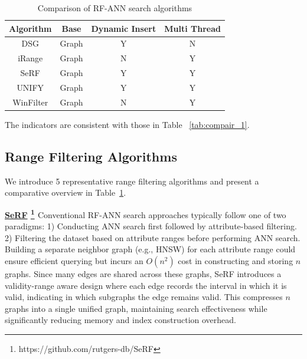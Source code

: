 \documentclass[sigconf, nonacm]{acmart}
\begin{document}
	
	
	\renewcommand{\arraystretch}{0.9}
	\begin{table}[t]
		\centering
		
		\setlength{\textfloatsep}{0.1cm}
		\caption{Comparison of RF-ANN search algorithms}
		\small	%
		\label{tab:range_algo}
		\begin{tabular}{|c|c|c|c|}
			\hline
			\textbf{Algorithm} & \textbf{Base} & \textbf{Dynamic Insert} & \textbf{Multi Thread} \\
			\hline
			DSG & Graph & Y & N \\
			iRange & Graph & N & Y \\
			SeRF & Graph & Y & Y \\
			UNIFY & Graph & Y & Y \\
			WinFilter & Graph & N & Y  \\
			\hline
		\end{tabular}
		
		
		\footnotesize{
			\begin{minipage}{\linewidth}
				\centering
				The indicators are consistent with those in Table ~\ref{tab:compair_1}.
			\end{minipage} 
			
		}
		
	\end{table}
	
	\subsection{Range Filtering Algorithms}
	
	We introduce 5 representative range filtering algorithms and present a comparative overview in Table~\ref{tab:range_algo}.
	
	\noindent\textbf{\underline{SeRF} \footnote{https://github.com/rutgers-db/SeRF} \cite{serf}} Conventional RF-ANN search approaches typically follow one of two paradigms: 1) Conducting ANN search first followed by attribute-based filtering. 2) Filtering the dataset based on attribute ranges before performing ANN search. Building a separate neighbor graph (e.g., HNSW) for each attribute range could ensure efficient querying but incurs an $O(n^2)$ cost in constructing and storing $n$ graphs. Since many edges are shared across these graphs, SeRF introduces a validity-range aware design where each edge records the interval in which it is valid, indicating in which subgraphs the edge remains valid. This compresses $n$ graphs into a single unified graph, maintaining search effectiveness while significantly reducing memory and index construction overhead.
	
\end{document}
